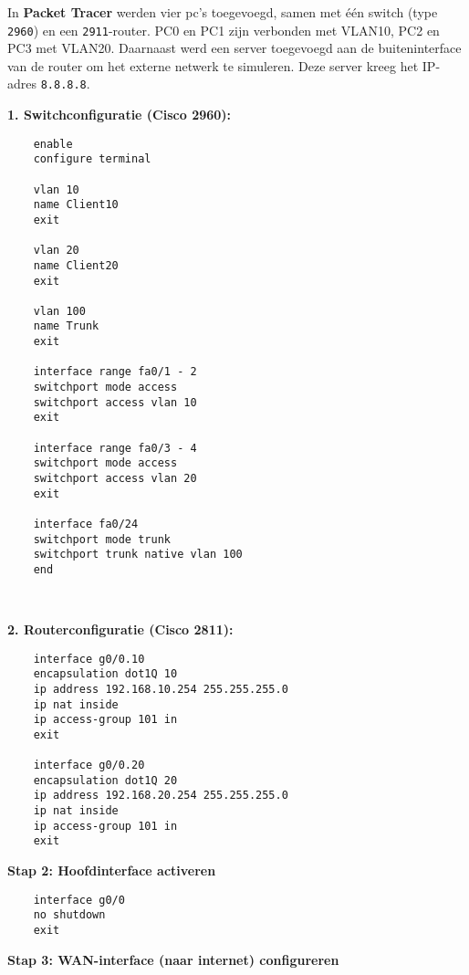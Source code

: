 \vspace{0.5cm}

\subsubsection{}

In \textbf{Packet Tracer} werden vier pc’s toegevoegd, samen met één switch (type \texttt{2960}) en een \texttt{2911}-router. PC0 en PC1 zijn verbonden met VLAN10, PC2 en PC3 met VLAN20. Daarnaast werd een server toegevoegd aan de buiteninterface van de router om het externe netwerk te simuleren. Deze server kreeg het IP-adres \texttt{8.8.8.8}.

\textbf{1. Switchconfiguratie (Cisco 2960):}
\begin{verbatim}
    enable
    configure terminal
    
    vlan 10
    name Client10
    exit
    
    vlan 20
    name Client20
    exit
    
    vlan 100
    name Trunk
    exit
    
    interface range fa0/1 - 2
    switchport mode access
    switchport access vlan 10
    exit
    
    interface range fa0/3 - 4
    switchport mode access
    switchport access vlan 20
    exit
    
    interface fa0/24
    switchport mode trunk
    switchport trunk native vlan 100
    end
    
    
\end{verbatim}

\textbf{2. Routerconfiguratie (Cisco 2811):}

\begin{verbatim}
    interface g0/0.10
    encapsulation dot1Q 10
    ip address 192.168.10.254 255.255.255.0
    ip nat inside
    ip access-group 101 in
    exit
    
    interface g0/0.20
    encapsulation dot1Q 20
    ip address 192.168.20.254 255.255.255.0
    ip nat inside
    ip access-group 101 in
    exit
\end{verbatim}

\textbf{Stap 2: Hoofdinterface activeren}

\begin{verbatim}
    interface g0/0
    no shutdown
    exit
\end{verbatim}

\textbf{Stap 3: WAN-interface (naar internet) configureren}

